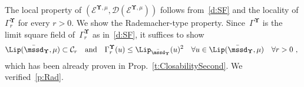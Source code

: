 \documentclass[11pt,letterpaper]{amsart}
\newcommand{\Kappa}{\mathrm{K}}
\newcommand{\T}{\tau} %
\newcommand{\Ed}{{\msE_\mssd}}
\newcommand{\Ch}{\mathsf{Ch}}
\newcommand{\dom}[1]{\mathcal D(#1)}
\newcommand{\nlim}{\lim_{n}}								%
\newcommand{\paren}[1]{\left(#1\right)}							%
\newcommand{\seq}[1]{\paren{#1}}								%
\DeclareMathOperator{\car}{\mathbf 1}
\newcommand{\comma}{\,\,\mathrm{,}\;\,}
\newcommand{\fstop}{\,\,\mathrm{.}}
\newcommand{\cdc}{\Gamma}
\newcommand{\EE}[2]{\mcE^{#1, #2}}
\newcommand{\SF}[2]{\cdc^{#1, #2}}
\newcommand{\QP}{{\mu}}
\newcommand{\dUpsilon}{{\mathbf \Upsilon}}
\newcommand{\U}{\dUpsilon}
\newcommand{\E}{\mathcal E}
\renewcommand{\1}{\mathbf 1}
\renewcommand{\msE}{\mathscr K}
\numberwithin{equation}{section}
\theoremstyle{plain}
\theoremstyle{definition}
\theoremstyle{remark}
\begin{document}
The local property of $(\E^{\U, \QP}, \dom{\E^{\U, \QP}})$ follows from~\eqref{d:SF} and the locality of $\cdc^{\U}_r$ for every $r>0$.
We show the Rademacher-type property. 
Since~$\cdc^\U$ is the limit square field of~$\cdc^{\U}_r$ as in~\eqref{d:SF}, it suffices to show 
\begin{align*} %
\Lip(\bar{\mssd}_\U, \QP)  \subset \mathcal C_r \quad \text{and} \quad \cdc^\U_r(u) \le \Lip_{\bar{\mssd}_\U}(u)^2  \quad \forall u \in \Lip(\bar{\mssd}_\U, \QP) \quad \forall r>0\comma
\end{align*}
which has been already proven in Prop.~\ref{t:ClosabilitySecond}. We verified~\eqref{p:Rad}. 
%
\end{document}
